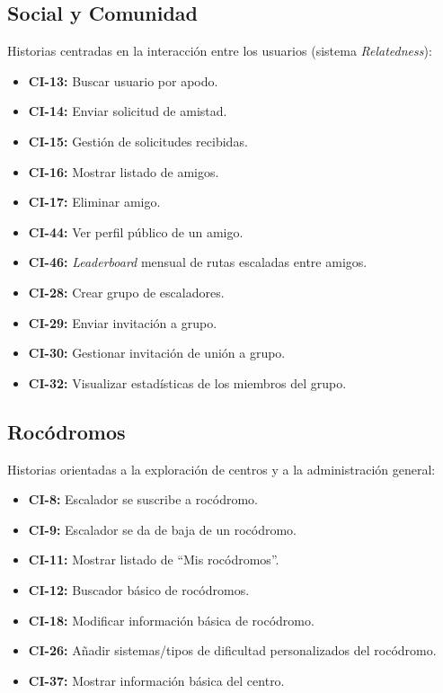 \subsection{Social y Comunidad}
Historias centradas en la interacción entre los usuarios (sistema \textit{Relatedness}):
\begin{itemize}
    \item \textbf{CI-13:} Buscar usuario por apodo.
    \item \textbf{CI-14:} Enviar solicitud de amistad.
    \item \textbf{CI-15:} Gestión de solicitudes recibidas.
    \item \textbf{CI-16:} Mostrar listado de amigos.
    \item \textbf{CI-17:} Eliminar amigo.
    \item \textbf{CI-44:} Ver perfil público de un amigo.
    \item \textbf{CI-46:} \textit{Leaderboard} mensual de rutas escaladas entre amigos.
    \item \textbf{CI-28:} Crear grupo de escaladores.
    \item \textbf{CI-29:} Enviar invitación a grupo.
    \item \textbf{CI-30:} Gestionar invitación de unión a grupo.
    \item \textbf{CI-32:} Visualizar estadísticas de los miembros del grupo.
\end{itemize}

\subsection{Rocódromos}
Historias orientadas a la exploración de centros y a la administración general:
\begin{itemize}
    \item \textbf{CI-8:} Escalador se suscribe a rocódromo.
    \item \textbf{CI-9:} Escalador se da de baja de un rocódromo.
    \item \textbf{CI-11:} Mostrar listado de ``Mis rocódromos''.
    \item \textbf{CI-12:} Buscador básico de rocódromos.
    \item \textbf{CI-18:} Modificar información básica de rocódromo.
    \item \textbf{CI-26:} Añadir sistemas/tipos de dificultad personalizados del rocódromo.
    \item \textbf{CI-37:} Mostrar información básica del centro.
\end{itemize}

